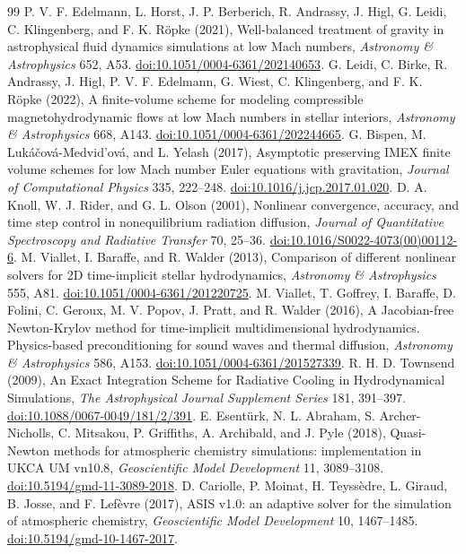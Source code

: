 \documentclass[english,a4paper]{my_memo}
\begin{document}
\begin{thebibliography}{99}
 P. V. F. Edelmann, L. Horst, J. P. Berberich, R. Andrassy, J. Higl, G. Leidi, C. Klingenberg, and F. K. R\"opke (2021), Well-balanced treatment of gravity in astrophysical fluid dynamics simulations at low Mach numbers, \emph{Astronomy \& Astrophysics} 652, A53. \href{https://doi.org/10.1051/0004-6361/202140653}{doi:10.1051/0004-6361/202140653}.
 G. Leidi, C. Birke, R. Andrassy, J. Higl, P. V. F. Edelmann, G. Wiest, C. Klingenberg, and F. K. R\"opke (2022), A finite-volume scheme for modeling compressible magnetohydrodynamic flows at low Mach numbers in stellar interiors, \emph{Astronomy \& Astrophysics} 668, A143. \href{https://doi.org/10.1051/0004-6361/202244665}{doi:10.1051/0004-6361/202244665}.
 G. Bispen, M. Luk\'a\v{c}ov\'a-Medvid'ov\'a, and L. Yelash (2017), Asymptotic preserving IMEX finite volume schemes for low Mach number Euler equations with gravitation, \emph{Journal of Computational Physics} 335, 222--248. \href{https://doi.org/10.1016/j.jcp.2017.01.020}{doi:10.1016/j.jcp.2017.01.020}.
 D. A. Knoll, W. J. Rider, and G. L. Olson (2001), Nonlinear convergence, accuracy, and time step control in nonequilibrium radiation diffusion, \emph{Journal of Quantitative Spectroscopy and Radiative Transfer} 70, 25--36. \href{https://doi.org/10.1016/S0022-4073(00)00112-6}{doi:10.1016/S0022-4073(00)00112-6}.
 M. Viallet, I. Baraffe, and R. Walder (2013), Comparison of different nonlinear solvers for 2D time-implicit stellar hydrodynamics, \emph{Astronomy \& Astrophysics} 555, A81. \href{https://doi.org/10.1051/0004-6361/201220725}{doi:10.1051/0004-6361/201220725}.
 M. Viallet, T. Goffrey, I. Baraffe, D. Folini, C. Geroux, M. V. Popov, J. Pratt, and R. Walder (2016), A Jacobian-free Newton-Krylov method for time-implicit multidimensional hydrodynamics. Physics-based preconditioning for sound waves and thermal diffusion, \emph{Astronomy \& Astrophysics} 586, A153. \href{https://doi.org/10.1051/0004-6361/201527339}{doi:10.1051/0004-6361/201527339}.
 R. H. D. Townsend (2009), An Exact Integration Scheme for Radiative Cooling in Hydrodynamical Simulations, \emph{The Astrophysical Journal Supplement Series} 181, 391--397. \href{https://doi.org/10.1088/0067-0049/181/2/391}{doi:10.1088/0067-0049/181/2/391}.
 E. Esent\"urk, N. L. Abraham, S. Archer-Nicholls, C. Mitsakou, P. Griffiths, A. Archibald, and J. Pyle (2018), Quasi-Newton methods for atmospheric chemistry simulations: implementation in UKCA UM vn10.8, \emph{Geoscientific Model Development} 11, 3089--3108. \href{https://doi.org/10.5194/gmd-11-3089-2018}{doi:10.5194/gmd-11-3089-2018}.
 D. Cariolle, P. Moinat, H. Teyss\`edre, L. Giraud, B. Josse, and F. Lef\`evre (2017), ASIS v1.0: an adaptive solver for the simulation of atmospheric chemistry, \emph{Geoscientific Model Development} 10, 1467--1485. \href{https://doi.org/10.5194/gmd-10-1467-2017}{doi:10.5194/gmd-10-1467-2017}.
\end{thebibliography}
\end{document}
